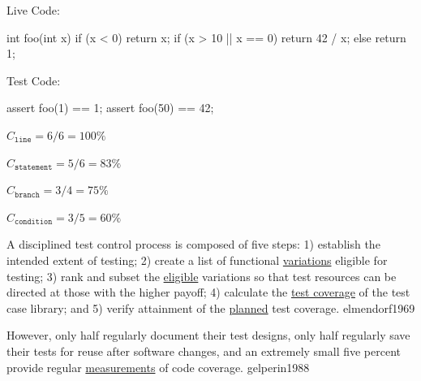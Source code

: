 \documentclass{article}
\begin{document}
\begin{multicols}{2}
Live Code:\par
{\small\begin{ffcode}
int foo(int x) {
  if (x < 0) { return x; }
  if (x > 10 || x == 0) {
    return 42 / x;
  } else {
    return 1;
  }
}
\end{ffcode}
}
\par\columnbreak\par
Test Code:\par
{\small\begin{ffcode}
assert foo(1) == 1;
assert foo(50) == 42;
\end{ffcode}
}
\( C_{\texttt{line}} = 6/6 = 100\% \)\par
\( C_{\texttt{statement}} = 5/6 = 83\% \)\par
\( C_{\texttt{branch}} = 3/4 = 75\% \)\par
\( C_{\texttt{condition}} = 3/5 = 60\% \)\par
\end{multicols}
\plush{}

  {A disciplined test control process is composed of five steps: 1) establish the intended extent of testing; 2) create a list of functional \ul{variations} eligible for testing; 3) rank and subset the \ul{eligible} variations so that test resources can be directed at those with the higher payoff; 4) calculate the \ul{test coverage} of the test case library; and 5) verify attainment of the \ul{planned} test coverage.}
  {elmendorf1969}
  
  {However, only half regularly document their test designs, only half regularly save their tests for reuse after software changes, and an extremely small five percent provide regular \ul{measurements} of code coverage.}
  {gelperin1988}
\end{document}

